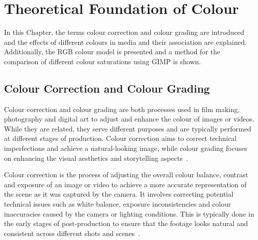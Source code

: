 \documentclass[../MasterThesis.tex]{subfiles}
\begin{document}
	

%
%
%
%
%
%
%
%
\newpage

\section{Theoretical Foundation of Colour} \label{section:theoreticalfoundationofcolour}

In this Chapter, the terms colour correction and colour grading are introduced and the effects of different colours in media and their association are explained. Additionally, the RGB colour model is presented and a method for the comparison of different colour saturations using GIMP is shown.





\subsection{Colour Correction and Colour Grading} 


Colour correction and colour grading are both processes used in film making, photography and digital art to adjust and enhance the colour of images or videos. 
While they are related, they serve different purposes and are typically performed at different stages of production.
%
Colour correction aims to correct technical imperfections and achieve a natural-looking image, while colour grading focuses on enhancing the visual aesthetics and storytelling aspects~\cite{cc_cg_1, cc_cg_2}.


Colour correction is the process of adjusting the overall colour balance, contrast and exposure of an image or video to achieve a more accurate representation of the scene as it was captured by the camera. It involves correcting potential technical issues such as white balance, exposure inconsistencies and colour inaccuracies caused by the camera or lighting conditions.
This is typically done in the early stages of post-production to ensure that the footage looks natural and consistent across different shots and scenes~\cite{cc1, cc_cg_1, cc_cg_2}.
\end{document}
